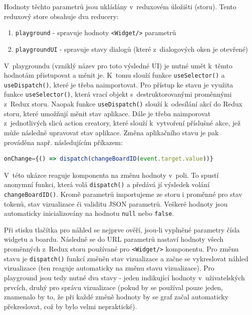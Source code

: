\documentclass[czech, bc, kiv, he, iso690numb, viewonly]{fasthesis} %
\begin{document}
Hodnoty těchto parametrů jsou ukládány v~reduxovém úložišti (storu). Tento reduxový store obsahuje dva reducery: 

\begin{enumerate}
	\item \texttt{playground} - spravuje hodnoty \texttt{<Widget/>} parametrů 
	\item \texttt{playgroundUI} - spravuje stavy dialogů (které z~dialogových oken je otevřené)
\end{enumerate}

V~playgroundu (vzniklý název pro toto výsledné UI) je nutné umět k~těmto hodnotám přistupovat a měnit je. K~tomu slouží funkce \texttt{useSelector()} a \texttt{useDispatch()},
které je třeba naimportovat. Pro přístup ke stavu je využita funkce \texttt{useSelector()}, která vrací objekt s~destruktorovanými proměnnými z~Redux storu. Naopak funkce 
\texttt{useDispatch()} slouží k~odesílání akcí do Redux storu, které umožňují měnit stav aplikace. Dále je třeba naimporovat z~jednotlivých sliců action creatory, které
slouží k~vytvoření příslušné akce, jež může následně upravovat stav aplikace. Změna aplikačního stavu je pak prováděna např. následujícím příkazem:

\begin{lstlisting}[language=Javascript]
onChange={() => dispatch(changeBoardID(event.target.value))}
\end{lstlisting}

V~této ukázce reaguje komponenta na změnu hodnoty v~poli. To spustí anonymní funkci, která volá \texttt{dispatch()} a předává jí výsledek volání \texttt{changeBoardID()}. Kromě parametrů
importujeme ze storu i proměnné pro stav tokenů, stav vizualizace či validitu JSON parametrů. Veškeré hodnoty jsou automaticky inicializovány na hodnotu \texttt{null} nebo \texttt{false}.

Při stisku tlačítka pro náhled se nejprve ověří, jsou-li vyplněné parametry čísla widgetu a boardu. Následně se do URL parametrů nastaví hodnoty všech proměnných z~Redux storu
používané pro \texttt{<Widget/>} komponentu. Pro změnu stavu je \texttt{dispatch()} funkcí změněn stav vizualizace a začne se vykreslovat náhled vizualizace (ten reaguje automaticky
na změnu stavu vizualizace). Pro playground jsou tedy nutné dva stavy - jeden indikující hodnoty v~uživatelských prvcích, druhý pro správu vizualizace (pokud by se používal pouze jeden,
znamenalo by to, že při každé změně hodnoty by se graf začal automaticky překreslovat, což by bylo velmi nepraktické).
\end{document}
